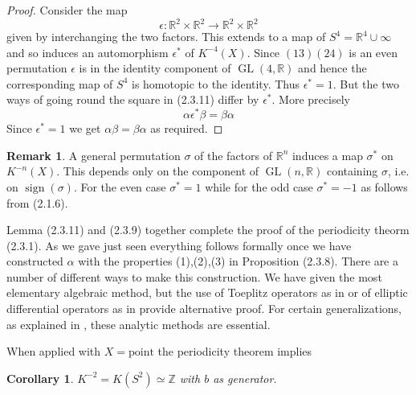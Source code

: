 \documentclass[leqno]{book}
\numberwithin{equation}{section}
\newtheorem{corollary}[theorem]{Corollary}
\theoremstyle{definition}
\newtheorem*{remark}{Remark}
\begin{document}
            \begin{proof}
              Consider the map
              \begin{equation*}
                \epsilon:\mathbb{R}^{2}\times \mathbb{R}^{2}\to \mathbb{R}^{2}\times \mathbb{R}^{2}
              \end{equation*}
              given by interchanging the two factors. This extends to a map of $S^{4}=\mathbb{R}^{4}\cup \infty$ and so induces an automorphism $\epsilon ^{*} $ of $K^{-4}(X)$. Since $(13)(24)$ is an even permutation $\epsilon$ is in the identity component of $\operatorname{GL}(4,\mathbb{R})$ and hence the corresponding map of $S^{4}$ is homotopic to the identity. Thus $\epsilon ^{*}=1$. But the two ways of going round the square in (2.3.11) differ by $\epsilon ^{*}$. More precisely 
              \begin{equation*}
                \alpha \epsilon^{*} \beta=\beta \alpha
              \end{equation*}
              Since $\epsilon^{*}=1$ we get $\alpha \beta=\beta \alpha$ as required.
            \end{proof}

            \begin{remark}
              A general permutation $\sigma$ of the factors of $\mathbb{R}^{n}$ induces a map $\sigma^{*}$ on $K^{-n}(X)$. This depends only on the component of $\operatorname{GL}(n,\mathbb{R})$ containing $\sigma$, i.e. on $\operatorname{sign}(\sigma)$. For the even case $\sigma^{*}=1$ while for the odd case $\sigma^{*}=-1$ as follows from (2.1.6).
            \end{remark}

            Lemma (2.3.11) and (2.3.9) together complete the proof of the periodicity theorm (2.3.1). As we gave just seen everything follows formally once we have constructed $\alpha$ with the properties (1),(2),(3) in Proposition (2.3.8). There are a number of different ways to make this construction. We have given the most elementary algebraic method, but the use of Toeplitz operators as in \cite{Atiyah2} or of elliptic differential operators as in \cite{Atiyah1} provide alternative proof. For certain generalizations, as explained in \cite{Atiyah1}, these analytic methods are essential.

            When applied with $X=\text{point}$ the periodicity theorem implies 
            \begin{corollary}
              $K^{-2}=K(S^{2})\simeq \mathbb{Z}$ with $b$ as generator.
            \end{corollary}
\end{document}
